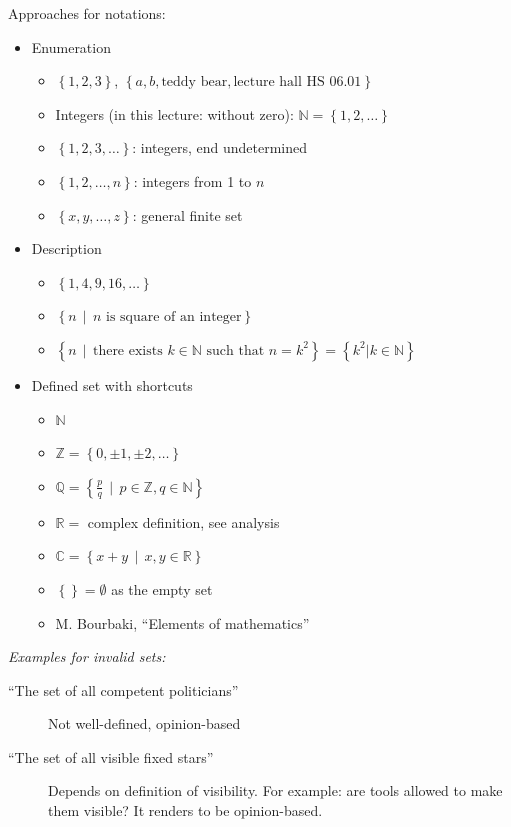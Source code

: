 \documentclass[a4paper,landscape,twocolumn]{article}
\newcommand\set[1]{\left\{#1\right\}}
\newcommand\setdef[2]{\left\{#1\,\middle|\,#2\right\}}
\newcommand\divides[2]{#1\,\mid\,#2}
\begin{document}
Approaches for notations:
\begin{itemize}
  \item Enumeration
    \begin{itemize}
      \item $\set{1,2, 3}$, $\set{a, b, \text{teddy bear}, \text{lecture hall HS 06.01}}$
      \item Integers (in this lecture: without zero): $\mathbb{N} = \set{1, 2, \ldots}$
      \item $\set{1, 2, 3, \ldots}$: integers, end undetermined
      \item $\set{1, 2, \ldots, n}$: integers from 1 to $n$
      \item $\set{x, y, \ldots, z}$: general finite set
    \end{itemize}
  \item Description
    \begin{itemize}
      \item $\set{1, 4, 9, 16, \ldots}$
      \item $\set{\divides{n}{n} \text{ is square of an integer}}$
      \item $\set{\divides{n}{\text{there exists } k \in \mathbb{N}} \text{ such that } n = k^2} = \set{k^2 | k \in \mathbb{N}}$
    \end{itemize}
  \item Defined set with shortcuts
    \begin{itemize}
      \item $\mathbb{N}$
      \item $\mathbb{Z} = \set{0, \pm 1, \pm 2, \ldots}$
      \item $\mathbb{Q} = \set{\divides{\frac{p}{q}}{p} \in \mathbb{Z}, q \in \mathbb{N}}$
      \item $\mathbb{R} = $ complex definition, see analysis
      \item $\mathbb{C} = \setdef{x + y}{x, y \in \mathbb{R}}$
      \item $\set{} = \emptyset$ as the empty set
      \item M. Bourbaki, \enquote{Elements of mathematics}
    \end{itemize}
\end{itemize}

\emph{Examples for invalid sets:}
\begin{description}
  \item[\enquote{The set of all competent politicians}]
    Not well-defined, opinion-based
  \item[\enquote{The set of all visible fixed stars}]
    Depends on definition of visibility. For example: are tools allowed to make them visible?
    It renders to be opinion-based.
\end{description}
\end{document}
